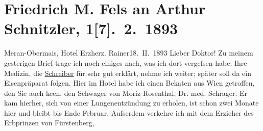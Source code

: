 

         
         \renewcommand{\erwaehntePersonen}{Personen:  ?? [Erzieher von Max von Fürstenberg], Maximilian Egon von Fürstenberg, Moritz Rosenthal, Sigmund Schraga, Joseph Schreiber}
         \renewcommand{\erwaehnteOrte}{Orte: Bozen, Erzherzog Rainer, Meran, München, Wien}
         \renewcommand{\erwaehnteWerke}{}
               \section[Friedrich M. Fels an Arthur Schnitzler, 1{[}7{]}. 2. 1893]{ Friedrich M. Fels an Arthur Schnitzler, 1{[}7{]}. 2. 1893}\nopagebreak{}\rehead{ }\begin{ledgroupsized}[t]{13cm}\normalsize\beginnumbering \toendnotes[C]{\smallbreak\pagebreak[2]} 
\toendnotes[C]{\smallbreak}\pstart
           \raggedleft{}{\pb}Meran-Obermais, Hotel Erzherz. Rainer18. II. 1893\pend
           \pstart{}Lieber Doktor!\pend\pstart
           Zu meinem gesterigen Brief trage ich noch einiges nach, was ich dort vergeſsen
               habe.\pend
           \pstart
           Ihre Medizin, die \uline{Schreiber} für sehr gut erklärt, nehme ich weiter; später soll da{\geminationn} ein Eisenpräparat folgen.\pend
           \pstart
           Hier im Hotel habe ich einen Beka{\geminationn}ten aus Wien getroffen, den Sie auch ke{\geminationn}en, den Schwager von Moriz Rosenthal, Dr. med. Schrager.
               Er kam hierher, sich von einer Lungenentzündung zu erholen, ist schon zwei Monate
               hier und bleibt bis Ende Februar. Auſserdem verkehre ich mit dem Erzieher des Erbprinzen von Fürstenberg,

\end{ledgroupsized}
